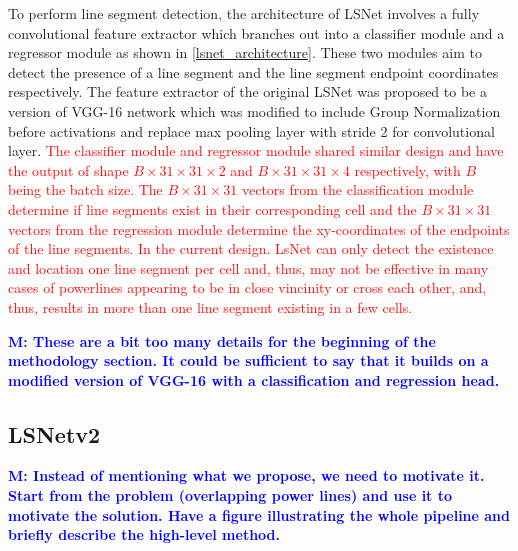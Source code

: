 \documentclass[journal]{IEEEtran}
\newcommand{\commentM}[1]{\textbf{\textcolor{blue}{M: #1}}}
\begin{document}
To perform line segment detection, the architecture of LSNet involves a fully convolutional feature extractor which branches out into a classifier module and a regressor module as shown in \ref{lsnet_architecture}. These two modules aim to detect the presence of a line segment and the line segment endpoint coordinates respectively. The feature extractor of the original LSNet was proposed to be a version of VGG-16 network \cite{VGG16} which was modified to include Group Normalization \cite{group_norm} before activations and replace max pooling layer with stride 2 for convolutional layer. \textcolor{red}{The classifier module and regressor module shared similar design and have the output of shape $B \times 31 \times 31 \times 2$ and $B \times 31 \times 31 \times 4$ respectively, with $B$ being the batch size. The $B \times 31 \times 31$ vectors from the classification module determine if line segments exist in their corresponding cell and the $B \times 31 \times 31$ vectors from the regression module determine the xy-coordinates of the endpoints of the line segments. In the current design. LsNet can only detect the existence and location one line segment per cell and, thus, may not be effective in many cases of powerlines appearing to be in close vincinity or cross each other, and, thus, results in more than one line segment existing in a few cells.}

\commentM{These are a bit too many details for the beginning of the methodology section. It could be sufficient to say that it builds on a modified version of VGG-16 with a classification and regression head.}

\subsection{LSNetv2}
\commentM{Instead of mentioning what we propose, we need to motivate it. Start from the problem (overlapping power lines) and use it to motivate the solution. Have a figure illustrating the whole pipeline and briefly describe the high-level method.}
\end{document}
